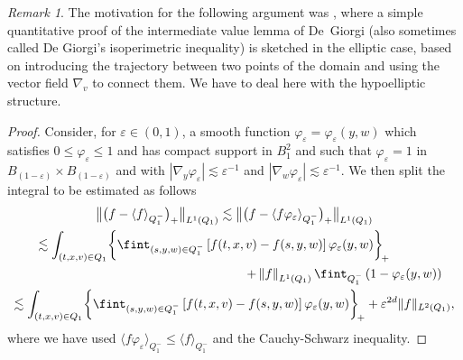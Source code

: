 \documentclass[10pt]{amsart}
\newcommand{\bnorm}[1]{\bigl\| #1 \bigr\|}
\newcommand{\nnorm}[1]{\| #1\|}
\theoremstyle{definition}
\theoremstyle{remark}
\newtheorem{remark}[theorem]{Remark}
\newcommand{\norm}[1]{\left\| #1 \right\|}
\let\var\varepsilon
\begin{document}
\begin{remark}
The motivation for the following argument was \cite[Lem.\,10,
p.\,11]{vasseur}, where a simple quantitative proof of the
intermediate value lemma of De~Giorgi (also sometimes called De
Giorgi's isoperimetric inequality) is sketched in the elliptic
case, based on introducing the trajectory between two points of
the domain and using the vector field $\nabla_v$ to connect
them. We have to deal here with the hypoelliptic structure.
\end{remark}

\begin{proof}
Consider, for $\var \in (0,1)$, a smooth function
$\varphi_\var=\varphi_\var(y,w)$ which satisfies
$0\leq \varphi_\var \leq 1$ and has compact support in
$B_1^{2}$ and such that $\varphi_\var=1$ in
$B_{(1-\var)}\times B_{(1-\var)}$ and with
$|\nabla_y \varphi_\var|\lesssim \var^{-1}$ and
$|\nabla_w \varphi_\var|\lesssim \var^{-1}$. We then split the
integral to be estimated as follows
\begin{multline*}
\bnorm{\bigl(f-\langle f
\rangle_{Q_1^{-}}\bigr)_+}_{L^{1}(Q_1)} \lesssim
\bnorm{\bigl(f-\langle f \varphi_\var
\rangle_{Q_1^{-}} \bigr)_+}_{L^{1}(Q_1)}\\
\hspace*{-1.13cm}\lesssim
\int_{(t,x,v) \in Q_1}
\biggl\{ \fint_{(s,y,w) \in Q_1^-} \left[
f(t,x,v)-f(s,y,w) \right] \varphi_\var(y,
w) \biggr\}_{\!+} \\
\shoveright{+ \norm{f}_{L^1(Q_1)}
\fint_{Q_{1}^{-}}\left( 1 - \varphi_\var(y,w) \right)}\\
\lesssim \int_{(t,x,v) \in Q_1}
\biggl\{ \fint_{(s,y,w) \in Q_1^-} \left[
f(t,x,v)-f(s,y,w) \right] \varphi_\var(y,
w) \biggr\}_{\!+} + \var^{2d} \nnorm{f}_{L^2(Q_1)},
\end{multline*}
where we have used
$\langle f \varphi_\var \rangle_{Q_1^{-}}\leq \langle f
\rangle_{Q_1^{-}}$ and the Cauchy-Schwarz inequality.


\end{proof}
\end{document}

